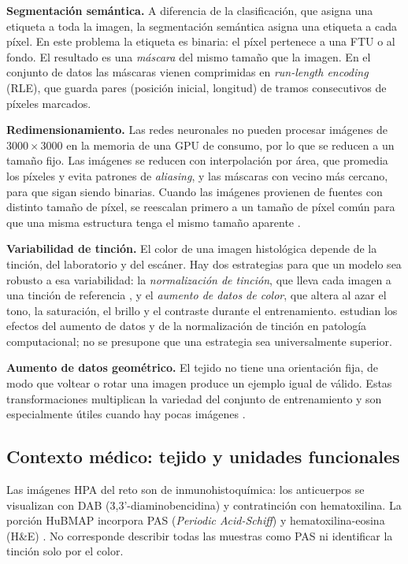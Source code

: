 \documentclass[11pt,letterpaper]{article}
\begin{document}
\textbf{Segmentación semántica.} A diferencia de la clasificación, que asigna una etiqueta a toda la
imagen, la segmentación semántica asigna una etiqueta a cada píxel. En este problema la etiqueta es
binaria: el píxel pertenece a una FTU o al fondo. El resultado es una \emph{máscara} del mismo tamaño
que la imagen. En el conjunto de datos las máscaras vienen comprimidas en \emph{run-length encoding}
(RLE), que guarda pares (posición inicial, longitud) de tramos consecutivos de píxeles marcados.

\textbf{Redimensionamiento.} Las redes neuronales no pueden procesar imágenes de $3000 \times 3000$
en la memoria de una GPU de consumo, por lo que se reducen a un tamaño fijo. Las imágenes se reducen
con interpolación por área, que promedia los píxeles y evita patrones de \emph{aliasing}, y las
máscaras con vecino más cercano, para que sigan siendo binarias. Cuando las imágenes provienen de
fuentes con distinto tamaño de píxel, se reescalan primero a un tamaño de píxel común para que una
misma estructura tenga el mismo tamaño aparente \parencite{jain2023hacking}.

\textbf{Variabilidad de tinción.} El color de una imagen histológica depende de la tinción, del
laboratorio y del escáner. Hay dos estrategias para que un modelo sea robusto a esa variabilidad: la
\emph{normalización de tinción}, que lleva cada imagen a una tinción de referencia
\parencite{macenko2009stain}, y el \emph{aumento de datos de color}, que altera al azar el tono, la
saturación, el brillo y el contraste durante el entrenamiento. \textcite{tellez2019stain} estudian
los efectos del aumento de datos y de la normalización de tinción en patología computacional;
no se presupone que una estrategia sea universalmente superior.

\textbf{Aumento de datos geométrico.} El tejido no tiene una orientación fija, de modo que voltear o
rotar una imagen produce un ejemplo igual de válido. Estas transformaciones multiplican la variedad
del conjunto de entrenamiento y son especialmente útiles cuando hay pocas imágenes
\parencite{ronneberger2015unet}.

\subsection{Contexto médico: tejido y unidades funcionales}

Las imágenes HPA del reto son de inmunohistoquímica: los anticuerpos se visualizan con DAB
(3,3'-diaminobencidina) y contratinción con hematoxilina. La porción HuBMAP incorpora PAS
(\emph{Periodic Acid-Schiff}) y hematoxilina-eosina (H\&E) \parencite{jain2023hacking}.
No corresponde describir todas las muestras como PAS ni identificar la tinción solo por el color.
\end{document}
